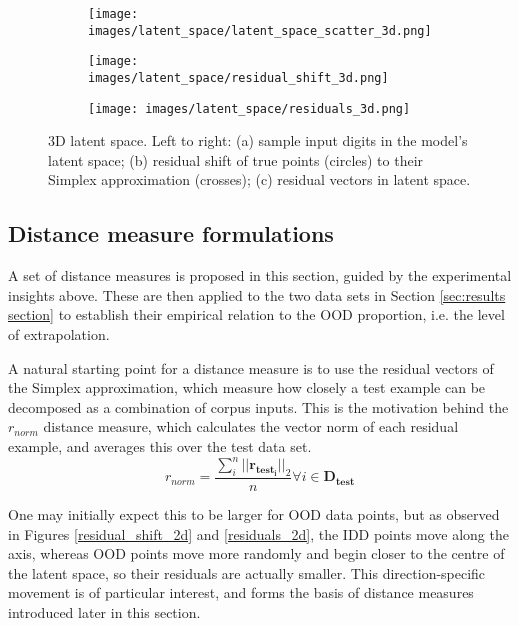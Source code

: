\documentclass{article}
\begin{document}
\begin{figure}[t]

\begin{subfigure}{.33\linewidth}
  \texttt{[image: images/latent\_space/latent\_space\_scatter\_3d.png]}
  \caption{}
  \label{latents_3d}
\end{subfigure}\hfill %
\begin{subfigure}{.33\linewidth}
  \texttt{[image: images/latent\_space/residual\_shift\_3d.png]}
  \caption{}
  \label{residual_shift_3d}
\end{subfigure}\hfill %
\begin{subfigure}{.33\linewidth}
  \texttt{[image: images/latent\_space/residuals\_3d.png]}
  \caption{}
  \label{residuals_3d}
\end{subfigure}

\caption{3D latent space. Left to right: (a) sample input digits in the model's latent space; (b) residual shift of true points (circles) to their Simplex approximation (crosses); (c) residual vectors in latent space.}
\label{fig:latent_plots_3d}
\end{figure}



\subsection{Distance measure formulations}
\label{sec:distance measures}
A set of distance measures is proposed in this section, guided by the experimental insights above. These are then applied to the two data sets in Section \ref{sec:results section} to establish their empirical relation to the OOD proportion, i.e. the level of extrapolation.

A natural starting point for a distance measure is to use the residual vectors of the Simplex approximation, which measure how closely a test example can be decomposed as a combination of corpus inputs. This is the motivation behind the $r_{norm}$ distance measure, which calculates the vector norm of each residual example, and averages this over the test data set.
\begin{equation}
\label{eq:r norm}
	r_{norm} = \frac{\sum_i^n ||\bm{r_{test_i}}||_2}{n}  \forall i  \in \bm{D_{test}}
\end{equation}

One may initially expect this to be larger for OOD data points, but as observed in Figures \ref{residual_shift_2d} and \ref{residuals_2d}, the IDD points move along the axis, whereas OOD points move more randomly and begin closer to the centre of the latent space, so their residuals are actually smaller. This direction-specific movement is of particular interest, and forms the basis of distance measures introduced later in this section.
\end{document}
